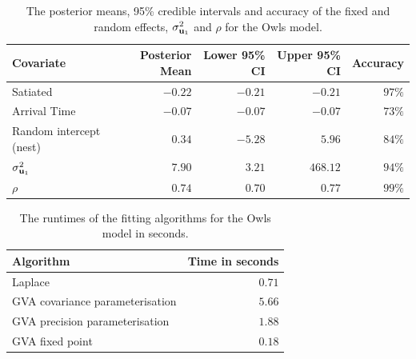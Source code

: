 \begin{table}
	\begin{tabular}{|l|rrrr|}
		\hline
		Covariate          & Posterior Mean & Lower 95\% CI & Upper 95\% CI & Accuracy \\
		\hline
		Satiated & $-0.22$ & $-0.21$ & $-0.21$ & $97\%$ \\
		Arrival Time & $-0.07$ & $-0.07$ & $-0.07$ & $73\%$ \\
		Random intercept (nest) & $0.34$ & $-5.28$ & $5.96$ & $84\%$ \\
		$\sigma_{{\bf u}_1}^2$ & $7.90$ & $3.21$ & $468.12$ & $94\%$ \\
		$\rho$ & $0.74$ & $0.70$ & $0.77$ & $99\%$ \\
		\hline
	\end{tabular}			
	\label{tab:owls_results}
	\caption{The posterior means, 95\% credible intervals and accuracy of the fixed and random
						effects, $\sigma_{{\bf u}_1}^2$ and $\rho$ for the Owls model.}
\end{table}

\begin{table}
	\begin{tabular}{|l|r|}
	\hline
	Algorithm & Time in seconds \\
	\hline
	Laplace & $0.71$ \\
	GVA covariance parameterisation & $5.66$ \\
	GVA precision parameterisation & $1.88$ \\
	GVA fixed point & $0.18$ \\
	\hline
	\end{tabular}
	\caption{The runtimes of the fitting algorithms for the Owls model in seconds.}
	\label{tab:owls_times}
\end{table}

